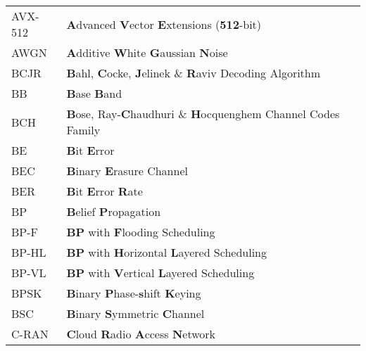 \begin{center}
\begin{longtable}{ p{}  p{} }
AVX-512     & \textbf{A}dvanced \textbf{V}ector \textbf{E}xtensions (\textbf{512}-bit)                                        \\
AWGN        & \textbf{A}dditive \textbf{W}hite \textbf{G}aussian \textbf{N}oise                                               \\
BCJR        & \textbf{B}ahl, \textbf{C}ocke, \textbf{J}elinek \& \textbf{R}aviv Decoding Algorithm                            \\
BB          & \textbf{B}ase \textbf{B}and                                                                                     \\
BCH         & \textbf{B}ose, Ray-\textbf{C}haudhuri \& \textbf{H}ocquenghem Channel Codes Family                              \\
BE          & \textbf{B}it \textbf{E}rror                                                                                     \\
BEC         & \textbf{B}inary \textbf{E}rasure Channel                                                                        \\
BER         & \textbf{B}it \textbf{E}rror \textbf{R}ate                                                                       \\
BP          & \textbf{B}elief \textbf{P}ropagation                                                                            \\
BP-F        & \textbf{BP} with \textbf{F}looding Scheduling                                                                   \\
BP-HL       & \textbf{BP} with \textbf{H}orizontal \textbf{L}ayered Scheduling                                                \\
BP-VL       & \textbf{BP} with \textbf{V}ertical \textbf{L}ayered Scheduling                                                  \\
BPSK        & \textbf{B}inary \textbf{P}hase-\textbf{s}hift \textbf{K}eying                                                   \\
BSC         & \textbf{B}inary \textbf{S}ymmetric \textbf{C}hannel                                                             \\
C-RAN       & \textbf{C}loud \textbf{R}adio \textbf{A}ccess \textbf{N}etwork                                                  \\

\end{longtable}
\end{center}
